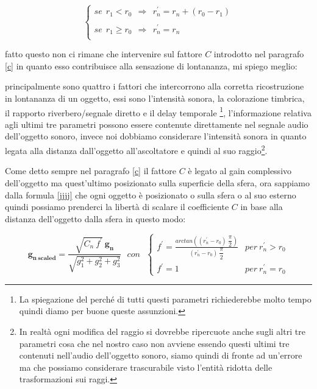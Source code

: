 \documentclass[12pt,a4paper]{report}
\begin{document}
\begin{equation}
\left\{\begin{matrix}
se\ \  r_1 < r_0\ \ \Rightarrow \ \ r_n^{\prime} = r_n+(r_0 - r_1) \\
\\
se\ \  r_1 \geq r_0\ \ \Rightarrow \ \ r_n^{\prime} = r_n\\
\end{matrix}\right.
\label{jjjj}
\end{equation}

fatto questo non ci rimane che intervenire sul fattore $C$ introdotto nel paragrafo \ref{c} in quanto esso contribuisce alla sensazione di lontananza, mi spiego meglio:

principalmente sono quattro i fattori che intercorrono alla corretta ricostruzione in lontananza di un oggetto, essi sono l'intensità sonora, la colorazione timbrica, il rapporto riverbero/segnale diretto e il delay temporale \footnote{La spiegazione del perché di tutti questi parametri richiederebbe molto tempo quindi diamo per buone queste assunzioni.}, l'informazione relativa agli ultimi tre parametri possono essere contenute direttamente nel segnale audio dell'oggetto sonoro, invece noi dobbiamo considerare l'intensità sonora in quanto legata alla distanza dall'oggetto all'ascoltatore e quindi al suo raggio\footnote{In realtà ogni modifica del raggio si dovrebbe ripercuote anche sugli altri tre parametri cosa che nel nostro caso non avviene essendo questi ultimi tre contenuti nell'audio dell'oggetto sonoro, siamo quindi di fronte ad un'errore ma che possiamo considerare trascurabile visto l'entità ridotta delle trasformazioni sui raggi.}.

Come detto sempre nel paragrafo \ref{c} il fattore $C$ è legato al gain complessivo dell'oggetto ma quest'ultimo posizionato sulla superficie della sfera, ora sappiamo dalla formula \ref{jjjj} che ogni oggetto è posizionato o sulla sfera o al suo esterno quindi possiamo prenderci la libertà di scalare il coefficiente $C$ in base alla distanza dell'oggetto dalla sfera in questo modo:

\begin{equation}
\boldsymbol{g_{n\ scaled}} = \dfrac{\sqrt{C_n \ f^{\prime}}\ \boldsymbol{g_n}}{\sqrt{g_1^2 +g_2^2 + g_3^2}} \ \ \ con \ \ \ \left\{\begin{matrix}
f^{\prime}= \frac{arctan\left((r_n^{\prime}-r_0)\ \dfrac{\pi}{2}\right)}{(r_n^{\prime}-r_0)\ \dfrac{\pi}{2}} & per\ r_n^{\prime}>r_0
\\
f^{\prime}=1 & per\ r_n^{\prime}=r_0
\end{matrix}\right.
\label{kkkk}
\end{equation}
\end{document}
